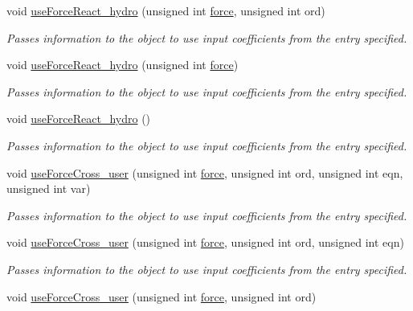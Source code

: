 \begin{DoxyCompactItemize}
void \hyperlink{classosea_1_1ofreq_1_1_motion_model_a51c60631ee1d3546bc1df88c04d50805}{use\-Force\-React\-\_\-hydro} (unsigned int \hyperlink{input__syntax_8dox_ab0a92c70357da47fe86696522eab7dc8}{force}, unsigned int ord)
\begin{DoxyCompactList}\small\item\em Passes information to the object to use input coefficients from the entry specified. \end{DoxyCompactList}\item 
void \hyperlink{classosea_1_1ofreq_1_1_motion_model_a62b3143f0a56d3cb5d8ffcc7eaf1968e}{use\-Force\-React\-\_\-hydro} (unsigned int \hyperlink{input__syntax_8dox_ab0a92c70357da47fe86696522eab7dc8}{force})
\begin{DoxyCompactList}\small\item\em Passes information to the object to use input coefficients from the entry specified. \end{DoxyCompactList}\item 
void \hyperlink{classosea_1_1ofreq_1_1_motion_model_a081dd7c11656da25fafa08f994685e48}{use\-Force\-React\-\_\-hydro} ()
\begin{DoxyCompactList}\small\item\em Passes information to the object to use input coefficients from the entry specified. \end{DoxyCompactList}\item 
void \hyperlink{classosea_1_1ofreq_1_1_motion_model_a1159117995080d2b62e50fceaeb29778}{use\-Force\-Cross\-\_\-user} (unsigned int \hyperlink{input__syntax_8dox_ab0a92c70357da47fe86696522eab7dc8}{force}, unsigned int ord, unsigned int eqn, unsigned int var)
\begin{DoxyCompactList}\small\item\em Passes information to the object to use input coefficients from the entry specified. \end{DoxyCompactList}\item 
void \hyperlink{classosea_1_1ofreq_1_1_motion_model_a3eabe29c2306d9a36445cfb4b27c4b02}{use\-Force\-Cross\-\_\-user} (unsigned int \hyperlink{input__syntax_8dox_ab0a92c70357da47fe86696522eab7dc8}{force}, unsigned int ord, unsigned int eqn)
\begin{DoxyCompactList}\small\item\em Passes information to the object to use input coefficients from the entry specified. \end{DoxyCompactList}\item 
void \hyperlink{classosea_1_1ofreq_1_1_motion_model_ac507056503b23bddf1e5fcf5850b7e8b}{use\-Force\-Cross\-\_\-user} (unsigned int \hyperlink{input__syntax_8dox_ab0a92c70357da47fe86696522eab7dc8}{force}, unsigned int ord)

\end{DoxyCompactItemize}
